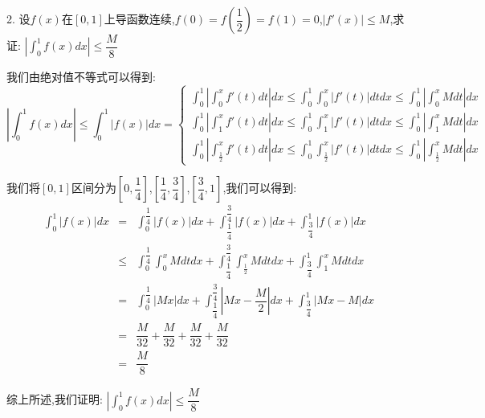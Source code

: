 2. 设$f(x)$在$[0,1]$上导函数连续,$f(0)=f(\dfrac{1}{2})=f(1)=0$,$|f'(x)|\leq M$,求证:  $|\int_{0}^{1}f(x)dx|\leq \dfrac{M}{8}$
\begin{solution}

	我们由绝对值不等式可以得到:  
	$$|\int_{0}^{1}f(x)dx|\leq \int_{0}^{1}|f(x)|dx=\left\lbrace
	\begin{array}{l}
		\int_{0}^{1}|\int_{0}^{x}f'(t)dt|dx\leq \int_{0}^{1}\int_{0}^{x}|f'(t)|dtdx\leq \int_{0}^{1}|\int_{0}^{x}Mdt|dx\\
		\int_{0}^{1}|\int_{1}^{x}f'(t)dt|dx\leq \int_{0}^{1}\int_{1}^{x}|f'(t)|dtdx\leq \int_{0}^{1}|\int_{1}^{x}Mdt|dx\\
		\int_{0}^{1}|\int_{\frac{1}{2}}^{x}f'(t)dt|dx\leq \int_{0}^{1}\int_{\frac{1}{2}}^{x}|f'(t)|dtdx\leq \int_{0}^{1}|\int_{\frac{1}{2}}^{x}Mdt|dx
	\end{array}
	\right. $$
	
	我们将$[0,1]$区间分为$[0,\dfrac{1}{4}]$,$[\dfrac{1}{4},\dfrac{3}{4}]$,$[\dfrac{3}{4},1]$,我们可以得到:  
	\begin{eqnarray*}
		\int_{0}^{1}|f(x)|dx&=&\int_{0}^{\dfrac{1}{4}}|f(x)|dx+\int_{\dfrac{1}{4}}^{\dfrac{3}{4}}|f(x)|dx+\int_{\dfrac{3}{4}}^{1}|f(x)|dx\\
		&\leq&\int_{0}^{\dfrac{1}{4}}\int_{0}^{x}Mdtdx+\int_{\dfrac{1}{4}}^{\dfrac{3}{4}}\int_{\frac{1}{2}}^{x}Mdtdx+\int_{\dfrac{3}{4}}^{1}\int_{1}^{x}Mdtdx\\
		&=&\int_{0}^{\dfrac{1}{4}}|Mx|dx+\int_{\dfrac{1}{4}}^{\dfrac{3}{4}}|Mx-\dfrac{M}{2}|dx+\int_{\dfrac{3}{4}}^{1}|Mx-M|dx\\
		&=&\dfrac{M}{32}+\dfrac{M}{32}+\dfrac{M}{32}+\dfrac{M}{32}\\
		&=&\dfrac{M}{8}
	\end{eqnarray*}

	综上所述,我们证明:  $|\int_{0}^{1}f(x)dx|\leq \dfrac{M}{8}$
\end{solution}


